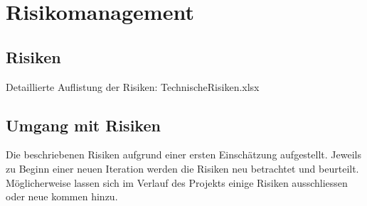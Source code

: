 \chapter{Risikomanagement}

\section{Risiken}
Detaillierte Auflistung der Risiken: TechnischeRisiken.xlsx
\section{Umgang mit Risiken}
Die beschriebenen Risiken aufgrund einer ersten Einschätzung aufgestellt.
Jeweils zu Beginn einer neuen Iteration werden die Risiken neu betrachtet und beurteilt. Möglicherweise lassen sich im Verlauf des Projekts einige Risiken ausschliessen oder neue kommen hinzu.

